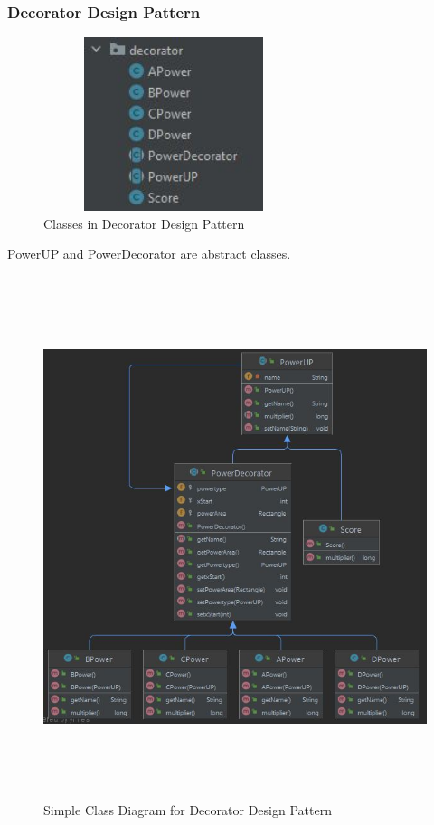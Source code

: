 \documentclass{article}
\begin{document}
\subsubsection{Decorator Design Pattern}
\begin{figure}[H]
    \centering
	\includegraphics[width=3in, height=2in]{t4.JPG}
	\caption[Optional caption]{Classes in Decorator Design Pattern}
	\label{}
\end{figure}
PowerUP and PowerDecorator are abstract classes.
\begin{figure}[H]
    \centering
	\includegraphics[width=7in, height=6in]{t5.JPG}
	\caption[Optional caption]{Simple Class Diagram for Decorator Design Pattern}
	\label{}
\end{figure}
\end{document}
